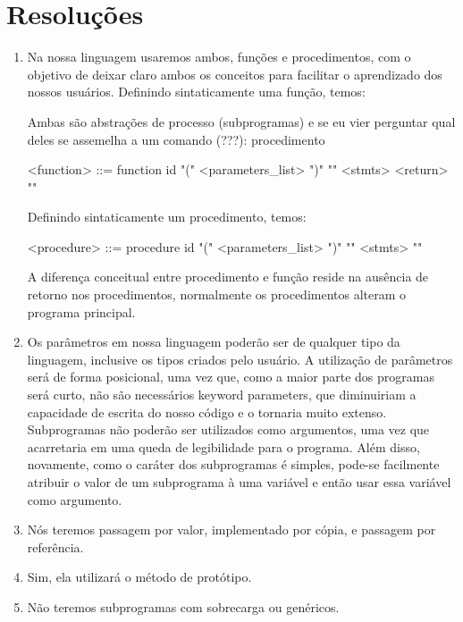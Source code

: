 \documentclass[12pt, a4paper]{article}
\begin{document}
    \section{Resoluções}
        \begin{enumerate}
            \item
            Na nossa linguagem usaremos ambos, funções e procedimentos, com o objetivo de deixar claro ambos os conceitos para facilitar o aprendizado dos nossos usuários. Definindo sintaticamente uma função, temos:

            Ambas são abstrações de processo (subprogramas) e se eu vier perguntar qual deles se assemelha a um comando (???): procedimento
            
            <function> 	::= function id "(" <parameters_list> ")" "{"
            <stmts> 
            <return> 
            "}"
            
            Definindo sintaticamente um procedimento, temos:
            
            <procedure>	::= procedure id "(" <parameters_list> ")" "{"
            			<stmts>
            			"}"
            
            A diferença conceitual entre procedimento e função reside na ausência de retorno nos procedimentos, normalmente os procedimentos alteram o programa principal.

            \item
            Os parâmetros em nossa linguagem poderão ser de qualquer tipo da linguagem, inclusive os tipos criados pelo usuário.
        	A utilização de parâmetros será de forma posicional, uma vez que, como a maior parte dos programas será curto, não são necessários keyword parameters, que diminuiriam a capacidade de escrita do nosso código e o tornaria muito extenso.
        	Subprogramas não poderão ser utilizados como argumentos, uma vez que acarretaria em uma queda de legibilidade para o programa. Além disso, novamente, como o caráter dos subprogramas é simples, pode-se facilmente atribuir o valor de um subprograma à uma variável e então usar essa variável como argumento.

            \item
            Nós teremos passagem por valor, implementado por cópia, e passagem por referência. 
            \item
            Sim, ela utilizará o método de protótipo.
            \item
            Não teremos subprogramas com sobrecarga ou genéricos.


\end{enumerate}
\end{document}
